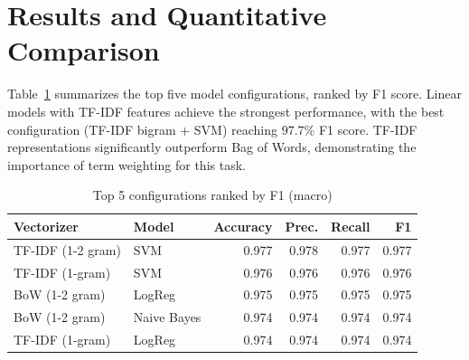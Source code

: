 \documentclass[12pt]{article}
\begin{document}
\section{Results and Quantitative Comparison}
Table~\ref{tab:results} summarizes the top five model configurations, ranked by F1 score. Linear models with TF-IDF features achieve the strongest performance, with the best configuration (TF-IDF bigram + SVM) reaching 97.7\% F1 score. TF-IDF representations significantly outperform Bag of Words, demonstrating the importance of term weighting for this task.

\begin{table}[h]
\centering
\caption{Top 5 configurations ranked by F1 (macro)}
\label{tab:results}
\begin{tabular}{l l r r r r}
\toprule
Vectorizer & Model & Accuracy & Prec. & Recall & F1 \\
\midrule
TF-IDF (1-2 gram) & SVM & 0.977 & 0.978 & 0.977 & 0.977 \\
TF-IDF (1-gram) & SVM & 0.976 & 0.976 & 0.976 & 0.976 \\
BoW (1-2 gram) & LogReg & 0.975 & 0.975 & 0.975 & 0.975 \\
BoW (1-2 gram) & Naive Bayes & 0.974 & 0.974 & 0.974 & 0.974 \\
TF-IDF (1-gram) & LogReg & 0.974 & 0.974 & 0.974 & 0.974 \\
\bottomrule
\end{tabular}
\end{table}



\end{document}
